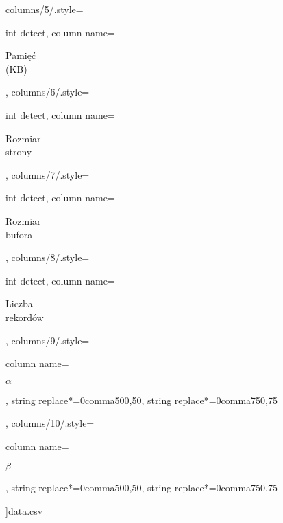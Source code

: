 \documentclass[12pt]{article}
\begin{document}
\begin{figure}[h]
\begin{adjustbox}{width=1.25\textwidth, center}
    columns/5/.style={int detect, column name={\begin{sideways}\footnotesize\hspace{0.3cm}Pamięć\\ (KB)\hspace{0.3cm}\end{sideways}}},
    columns/6/.style={int detect, column name={\begin{sideways}\footnotesize\hspace{0.3cm}Rozmiar\\ strony\hspace{0.3cm}\end{sideways}}},
    columns/7/.style={int detect, column name={\begin{sideways}\footnotesize\hspace{0.3cm}Rozmiar\\ bufora\hspace{0.3cm}\end{sideways}}},
    columns/8/.style={int detect, column name={\begin{sideways}\footnotesize\hspace{0.3cm}Liczba\\ rekordów\hspace{0.3cm}\end{sideways}}},
    columns/9/.style={
        column name={\begin{sideways}\footnotesize\hspace{0.3cm}$\alpha$\hspace{0.3cm}\end{sideways}},
        string replace*={0comma50}{0,50},
        string replace*={0comma75}{0,75}
    },
    columns/10/.style={
        column name={\begin{sideways}\footnotesize\hspace{0.3cm}$\beta$\hspace{0.3cm}\end{sideways}},
        string replace*={0comma50}{0,50},
        string replace*={0comma75}{0,75}
    }
]{data.csv}
\end{adjustbox} 
\end{figure}
\end{document}
